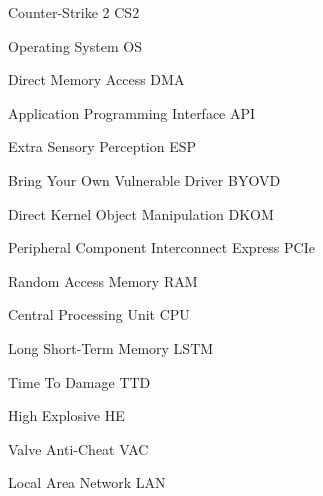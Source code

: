 
{Counter-Strike 2}
{CS2}

{Operating System}
{OS}

{Direct Memory Access}
{DMA}

{Application Programming Interface}
{API}

{Extra Sensory Perception}
{ESP}

{Bring Your Own Vulnerable Driver}
{BYOVD}

{Direct Kernel Object Manipulation}
{DKOM}

{Peripheral Component Interconnect Express}
{PCIe}

{Random Access Memory}
{RAM}

{Central Processing Unit}
{CPU}

{Long Short-Term Memory}
{LSTM}

{Time To Damage}
{TTD}

{High Explosive}
{HE}

{Valve Anti-Cheat}
{VAC}

{Local Area Network}
{LAN}
